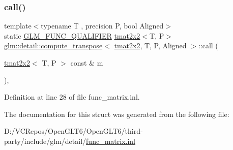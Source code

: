 \subsubsection{\texorpdfstring{call()}{call()}}
{\footnotesize\ttfamily template$<$typename T , precision P, bool Aligned$>$ \\
static \mbox{\hyperlink{setup_8hpp_a33fdea6f91c5f834105f7415e2a64407}{G\+L\+M\+\_\+\+F\+U\+N\+C\+\_\+\+Q\+U\+A\+L\+I\+F\+I\+ER}} \mbox{\hyperlink{structglm_1_1tmat2x2}{tmat2x2}}$<$T, P$>$ \mbox{\hyperlink{structglm_1_1detail_1_1compute__transpose}{glm\+::detail\+::compute\+\_\+transpose}}$<$ \mbox{\hyperlink{structglm_1_1tmat2x2}{tmat2x2}}, T, P, Aligned $>$\+::call (\begin{DoxyParamCaption}\item[{\mbox{\hyperlink{structglm_1_1tmat2x2}{tmat2x2}}$<$ T, P $>$ const \&}]{m }\end{DoxyParamCaption})\hspace{0.3cm}{\ttfamily [inline]}, {\ttfamily [static]}}



Definition at line 28 of file func\+\_\+matrix.\+inl.



The documentation for this struct was generated from the following file\+:\begin{DoxyCompactItemize}
\item 
D\+:/\+V\+C\+Repos/\+Open\+G\+L\+T6/\+Open\+G\+L\+T6/third-\/party/include/glm/detail/\mbox{\hyperlink{func__matrix_8inl}{func\+\_\+matrix.\+inl}}\end{DoxyCompactItemize}
